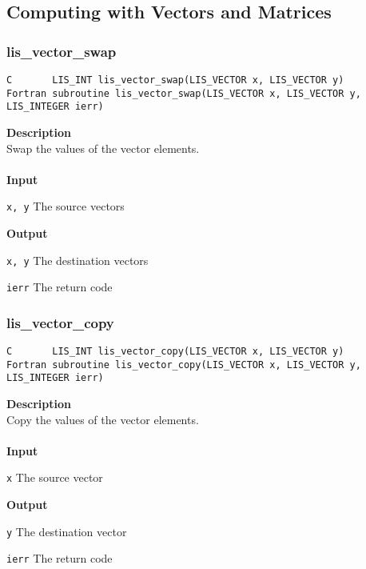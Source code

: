 \documentclass[a4paper]{article}
\newcommand{\namelistlabel}[1]{\mbox{#1}\hfill}
\newenvironment{namelist}[1]{%
\begin{list}{}
  {\let\makelabel\namelistlabel
  \settowidth{\labelwidth}{#1}
  \setlength{\leftmargin}{1.1\labelwidth}}
  }{%
\end{list}}
\begin{document}
\newpage
\subsection{Computing with Vectors and Matrices}
\subsubsection{lis\_vector\_swap}
\begin{screen}
\verb|C       LIS_INT lis_vector_swap(LIS_VECTOR x, LIS_VECTOR y)|\\
\verb|Fortran subroutine lis_vector_swap(LIS_VECTOR x, LIS_VECTOR y, LIS_INTEGER ierr)|
\end{screen}
{\bf Description}\\
\indent
Swap the values of the vector elements.
\\ \\
\noindent
{\bf Input}
\begin{namelist}{XXXXXXXXXXXXXXXXXXXX}
\item[\tt x, y] The source vectors
\end{namelist}
{\bf Output}
\begin{namelist}{XXXXXXXXXXXXXXXXXXXX}
\item[\tt x, y] The destination vectors
\item[\tt ierr] The return code
\end{namelist}

\subsubsection{lis\_vector\_copy}
\begin{screen}
\verb|C       LIS_INT lis_vector_copy(LIS_VECTOR x, LIS_VECTOR y)|\\
\verb|Fortran subroutine lis_vector_copy(LIS_VECTOR x, LIS_VECTOR y, LIS_INTEGER ierr)|
\end{screen}
{\bf Description}\\
\indent
Copy the values of the vector elements.
\\ \\
\noindent
{\bf Input}
\begin{namelist}{XXXXXXXXXXXXXXXXXXXX}
\item[\tt x] The source vector
\end{namelist}
{\bf Output}
\begin{namelist}{XXXXXXXXXXXXXXXXXXXX}
\item[\tt y] The destination vector
\item[\tt ierr] The return code
\end{namelist}
\end{document}

